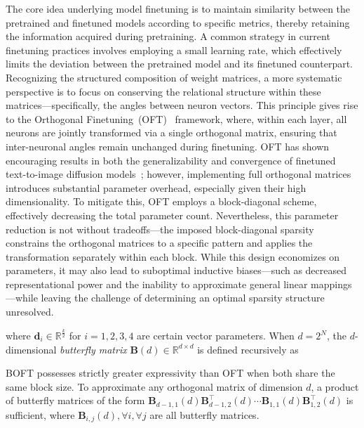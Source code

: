 The core idea underlying model finetuning is to maintain similarity between the pretrained and finetuned models according to specific metrics, thereby retaining the information acquired during pretraining. A common strategy in current finetuning practices involves employing a small learning rate, which effectively limits the deviation between the pretrained model and its finetuned counterpart. Recognizing the structured composition of weight matrices, a more systematic perspective is to focus on conserving the relational structure within these matrices—specifically, the angles between neuron vectors. This principle gives rise to the Orthogonal Finetuning~(OFT)~\cite{qiu2023controlling} framework, where, within each layer, all neurons are jointly transformed via a single orthogonal matrix, ensuring that inter-neuronal angles remain unchanged during finetuning. OFT has shown encouraging results in both the generalizability and convergence of finetuned text-to-image diffusion models~\cite{qiu2023controlling}; however, implementing full orthogonal matrices introduces substantial parameter overhead, especially given their high dimensionality. To mitigate this, OFT employs a block-diagonal scheme, effectively decreasing the total parameter count. Nevertheless, this parameter reduction is not without tradeoffs—the imposed block-diagonal sparsity constrains the orthogonal matrices to a specific pattern and applies the transformation separately within each block. While this design economizes on parameters, it may also lead to suboptimal inductive biases—such as decreased representational power and the inability to approximate general linear mappings—while leaving the challenge of determining an optimal sparsity structure unresolved.

where $\bm{d}_i\in\mathbb{R}^{\frac{k}{2}}$ for $i=1,2,3,4$ are certain vector parameters. When $d=2^N$, the $d$-dimensional \emph{butterfly matrix} $\bm{B}(d)\in\mathbb{R}^{d\times d}$ is defined recursively as

\begin{theorem}\label{thm:exp_boft}
    BOFT possesses strictly greater expressivity than OFT when both share the same block size. To approximate any orthogonal matrix of dimension $d$, a product of butterfly matrices of the form $\bm{B}_{d-1,1}(d)\bm{B}^\top_{d-1,2}(d)\cdots\bm{B}_{1,1}(d)\bm{B}^\top_{1,2}(d)$ is sufficient, where $\bm{B}_{i,j}(d), \forall i, \forall j$ are all butterfly matrices.
\end{theorem}

